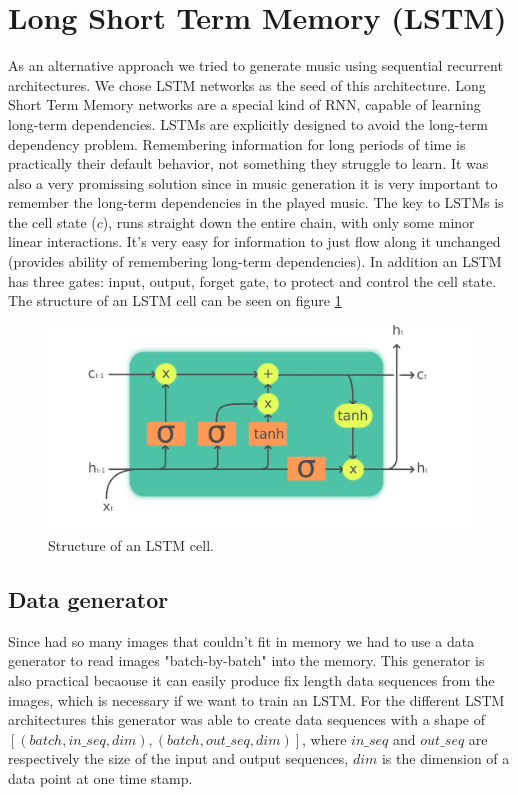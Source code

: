 \documentclass{article}
\begin{document}
\section{Long Short Term Memory (LSTM)}

As an alternative approach we tried to generate music using sequential recurrent architectures. We chose LSTM networks as the seed of this architecture. Long Short Term Memory networks are a special kind of RNN, capable of learning long-term dependencies. 
LSTMs are explicitly designed to avoid the long-term dependency problem. Remembering information for long periods of time is practically their default behavior, not something they struggle to learn. It was also a very promissing solution since in music generation it is very important to remember the long-term dependencies in the played music. The key to LSTMs is the cell state ($c$), runs straight down the entire chain, with only some minor linear interactions. It’s very easy for information to just flow along it unchanged (provides ability of remembering long-term dependencies). In addition an LSTM has three gates: input, output, forget gate, to protect and control the cell state. The structure of an LSTM cell can be seen on figure \ref{fig:lstmcell}

\begin{figure}[!htb]
	\centering
	\includegraphics[width=\linewidth]{LSTMcell.png}
	\caption{Structure of an LSTM cell.}
	\label{fig:lstmcell}
\end{figure}

\subsection{Data generator}

Since had so many images that couldn't fit in memory we had to use a data generator to read images "batch-by-batch" into the memory. This generator is also practical becaouse it can easily produce fix length data sequences from the images, which is necessary if we want to train an LSTM. For the different LSTM architectures this generator was able to create data sequences with a shape of $[(batch, in\_seq, dim), (batch, out\_seq, dim)]$, where $in\_seq$ and $out\_seq$ are respectively the size of the input and output sequences, $dim$ is the dimension of a data point at one time stamp.  
\end{document}
